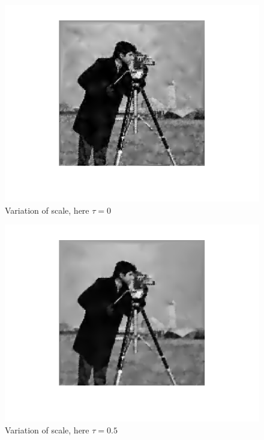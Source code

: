 \documentclass{report}
\begin{document}
\begin{figure}
	\centering
	\includegraphics[]{../out/report_taus01.png}
	\caption{Variation of scale, here $\tau = 0$}
	\label{vis:taus01}
\end{figure}

\begin{figure}
	\centering
	\includegraphics[]{../out/report_taus02.png}
	\caption{Variation of scale, here $\tau = 0.5$}
	\label{vis:taus02}
\end{figure}
\end{document}
